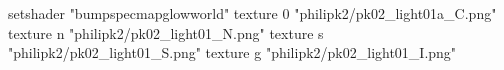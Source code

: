 setshader "bumpspecmapglowworld"
    texture 0 "philipk2/pk02_light01a_C.png"
    texture n "philipk2/pk02_light01_N.png"
    texture s "philipk2/pk02_light01_S.png"
    texture g "philipk2/pk02_light01_I.png"